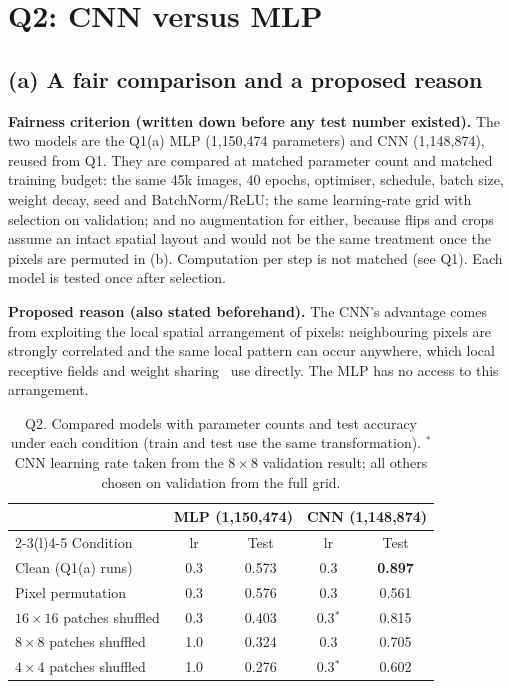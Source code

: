 \section{Q2: CNN versus MLP}
\label{sec:q2}

\subsection{(a) A fair comparison and a proposed reason}
\textbf{Fairness criterion (written down before any test number existed).} The two models are the Q1(a) MLP
(1{,}150{,}474 parameters) and CNN (1{,}148{,}874), reused from Q1. They are compared at matched parameter
count and matched training budget: the same 45k images, 40 epochs, optimiser, schedule, batch size, weight
decay, seed and BatchNorm/ReLU; the same learning-rate grid with selection on validation; and no augmentation
for either, because flips and crops assume an intact spatial layout and would not be the same treatment once the
pixels are permuted in (b). Computation per step is not matched (see Q1). Each model is tested once after
selection.

\textbf{Proposed reason (also stated beforehand).} The CNN's advantage comes from exploiting the local spatial
arrangement of pixels: neighbouring pixels are strongly correlated and the same local pattern can occur
anywhere, which local receptive fields and weight sharing~\cite{lecun1998gradient} use directly. The MLP has no
access to this arrangement.

\begin{table}[t]
\centering
\small
\begin{tabular}{@{}lcccc@{}}
\toprule
& \multicolumn{2}{c}{MLP (1{,}150{,}474)} & \multicolumn{2}{c}{CNN (1{,}148{,}874)} \\
\cmidrule(lr){2-3}\cmidrule(l){4-5}
Condition & lr & Test & lr & Test \\
\midrule
Clean (Q1(a) runs) & 0.3 & 0.573 & 0.3 & \textbf{0.897} \\
Pixel permutation & 0.3 & 0.576 & 0.3 & 0.561 \\
$16\times16$ patches shuffled & 0.3 & 0.403 & 0.3$^*$ & 0.815 \\
$8\times8$ patches shuffled & 1.0 & 0.324 & 0.3 & 0.705 \\
$4\times4$ patches shuffled & 1.0 & 0.276 & 0.3$^*$ & 0.602 \\
\bottomrule
\end{tabular}
\caption{Q2. Compared models with parameter counts and test accuracy under each condition (train and test use
the same transformation). $^*$CNN learning rate taken from the $8\times8$ validation result; all others chosen
on validation from the full grid.}
\label{tab:q2}
\end{table}

